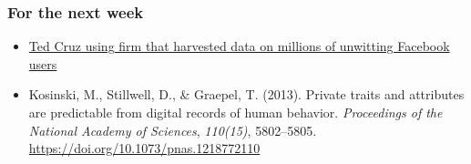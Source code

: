 \documentclass[aspectratio=169]{beamer}
\begin{document}
\begin{frame}
{\begin{figure}
        \end{figure}
    }
\end{frame}


\begin{frame}
    \frametitle{For the next week}
    \begin{itemize}
       \item \textcolor{blue}{\href{https://www.theguardian.com/us-news/2015/dec/11/senator-ted-cruz-president-campaign-facebook-user-data}{Ted Cruz using firm that harvested data on millions of unwitting Facebook users}}
       \item Kosinski, M., Stillwell, D., \& Graepel, T. (2013). Private traits and attributes are predictable from digital records of human behavior. \textit{Proceedings of the National Academy of Sciences}, \textit{110(15)}, 5802–5805. \textcolor{blue}{\href{https://doi.org/10.1073/pnas.1218772110}{https://doi.org/10.1073/pnas.1218772110}}
    \end{itemize}
    
\end{frame}
\end{document}
